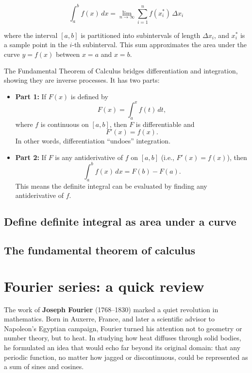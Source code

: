 \documentclass{book}
\begin{document}
\[
\int_a^b f(x) \, dx = \lim_{n \to \infty} \sum_{i=1}^n f(x_i^*) \, \Delta x_i
\]

where the interval \([a, b]\) is partitioned into subintervals of length \(\Delta x_i\), and \(x_i^*\) is a sample point in the \(i\)-th subinterval. This sum approximates the area under the curve \( y = f(x) \) between \( x = a \) and \( x = b \).

The Fundamental Theorem of Calculus bridges differentiation and integration, showing they are inverse processes. It has two parts:

\begin{itemize}
    \item \textbf{Part 1:} If \( F(x) \) is defined by
    \[
    F(x) = \int_a^x f(t) \, dt,
    \]
    where \( f \) is continuous on \([a,b]\), then \( F \) is differentiable and
    \[
    F'(x) = f(x).
    \]
    In other words, differentiation “undoes” integration.

    \item \textbf{Part 2:} If \( F \) is any antiderivative of \( f \) on \([a,b]\) (i.e., \( F'(x) = f(x) \)), then
    \[
    \int_a^b f(x) \, dx = F(b) - F(a).
    \]
    This means the definite integral can be evaluated by finding any antiderivative of \( f \).
\end{itemize}

\section{Define definite integral as area under a curve}

\section{The fundamental theorem of calculus}



\chapter{Fourier series: a quick review}

The work of \textbf{Joseph Fourier} (1768--1830) marked a quiet revolution in mathematics. Born in Auxerre, France, and later a scientific advisor to Napoleon's Egyptian campaign, Fourier turned his attention not to geometry or number theory, but to heat. In studying how heat diffuses through solid bodies, he formulated an idea that would echo far beyond its original domain: that any periodic function, no matter how jagged or discontinuous, could be represented as a sum of sines and cosines.\\
\end{document}
